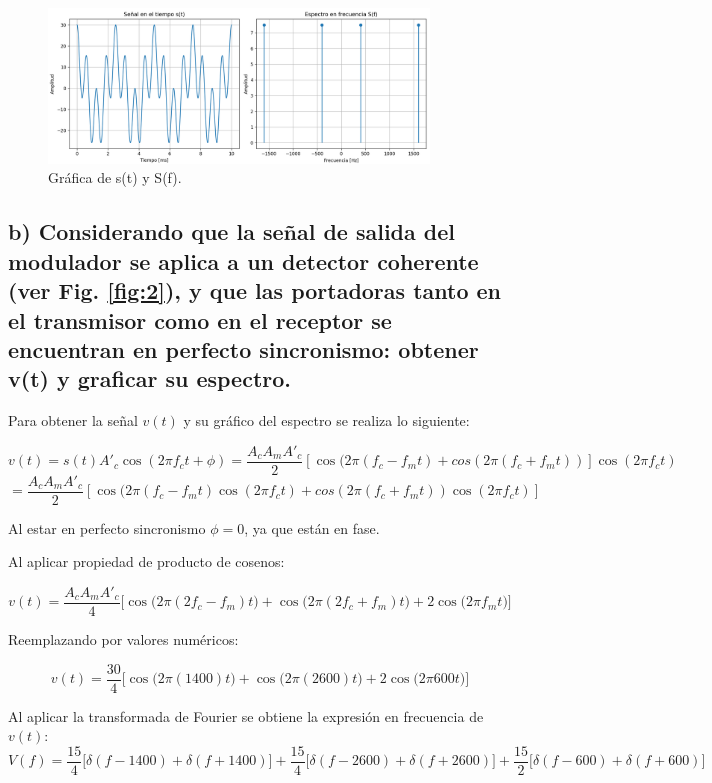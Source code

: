 \begin{figure}[H]
        \centering
        \includegraphics[width=0.9\textwidth]{imagenes/Parte_1/Actividad_4/actividad_4a.png}
        \caption{Gráfica de s(t) y S(f).}
        \label{fig:actividad_4a}
    \end{figure}



\subsection*{b) Considerando que la señal de salida del modulador se aplica a un detector coherente (ver Fig. \ref{fig:2}), y que las portadoras tanto en el transmisor como en el receptor se encuentran en perfecto sincronismo: obtener v(t) y graficar su espectro.}
\bigskip
Para obtener la señal $v(t)$ y su gráfico del espectro se realiza lo siguiente:

\[
v(t) = s(t)  A'_c \cos(2\pi f_c t+ \phi) =\frac{A_c A_m A'_c}{2}[\cos(2\pi (f_c-f_m t)+cos(2\pi (f_c+f_m t))] \cos(2\pi f_c t)
\]
\[
 =\frac{A_c A_m A'_c}{2}[\cos(2\pi (f_c-f_m t)\cos(2\pi f_c t)+cos(2\pi (f_c+f_m t))\cos(2\pi f_c t)] 
\]

Al estar en perfecto sincronismo $\phi=0$, ya que están en fase.
\bigskip

Al aplicar propiedad de producto de cosenos:

\[
v(t) = \frac{A_c A_m A'_c}{4}
\Big[
\cos\big(2\pi(2f_c - f_m)t\big)
+ 
\cos\big(2\pi(2f_c + f_m)t\big)
+ 
2\cos\big(2\pi f_m t\big)
\Big]
\]

Reemplazando por valores numéricos:

\[
v(t) = \frac{30}{4}
\Big[
\cos\big(2\pi(1400)t\big)
+ 
\cos\big(2\pi(2600)t\big)
+ 
2\cos\big(2\pi 600 t\big)
\Big]
\]

Al aplicar la transformada de Fourier se obtiene la expresión en frecuencia de $v(t)$:
\[
V(f) =
\frac{15}{4}
\Big[
\delta(f - 1400) + \delta(f + 1400)
\Big]
+
\frac{15}{4}
\Big[
\delta(f - 2600) + \delta(f + 2600)
\Big]
+
\frac{15}{2}
\Big[
\delta(f - 600) + \delta(f + 600)
\Big]
\]

